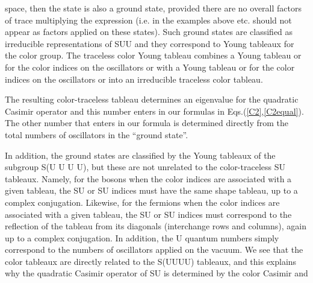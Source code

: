 \documentclass[a4paper,aps,preprint,nofootinbib]{revtex4}
\begin{document}
space, then the state is also a ground state, provided there are no overall
factors of trace multiplying the expression (i.e. in the examples above \coordHE{} etc. should not appear as factors applied on these
states). Such ground states are classified as irreducible representations of
SU\coordHE{}U\myHighlight{$\left( 1\right) $}\coordHE{} and they correspond to Young
tableaux for the color group. The traceless color Young tableau combines a
Young tableau \coordHE{} or \coordHE{} for the color indices on the oscillators
\coordHE{} or \myHighlight{$\psi,$}\coordHE{} with a Young tableau \coordHE{} or \coordHE{} for
the color indices on the oscillators \coordHE{} or \myHighlight{$\chi,$}\coordHE{} into an irreducible
traceless color tableau.

The resulting color-traceless tableau determines an eigenvalue for the
quadratic Casimir operator \coordHE{} and this
number enters in our formulas in Eqs.(\ref{C2},\ref{C2equal}). The other
number \myHighlight{$\Delta$}\coordHE{} that enters in our formula is determined directly from the
total numbers of oscillators \coordHE{} in the
\textquotedblleft ground state\textquotedblright.

In addition, the ground states are classified by the Young tableaux of the
subgroup S(U\coordHE{} U\coordHE{} U\coordHE{} U\coordHE{}), but these are not unrelated to the
color-traceless SU\coordHE{} tableaux. Namely, for the bosons \coordHE{} when the
color indices are associated with a given tableau, the SU\coordHE{} or SU\coordHE{}
indices must have the same shape tableau, up to a complex conjugation.
Likewise, for the fermions \myHighlight{$\psi,\chi$}\coordHE{} when the color indices are associated
with a given tableau, the SU\coordHE{} or SU\coordHE{} indices must correspond to the
reflection of the tableau from its diagonals (interchange rows and columns),
again up to a complex conjugation. In addition, the U\myHighlight{$\left( 1\right) $}\coordHE{}
quantum numbers simply correspond to the numbers of oscillators \coordHE{} applied on the vacuum. We see that the color
tableaux are directly related to the S(U\coordHE{}U\coordHE{}U\coordHE{}U\coordHE{}) tableaux, and
this explains why the quadratic Casimir operator of SU\coordHE{} is determined by the color Casimir and \coordHE{}
\end{document}
